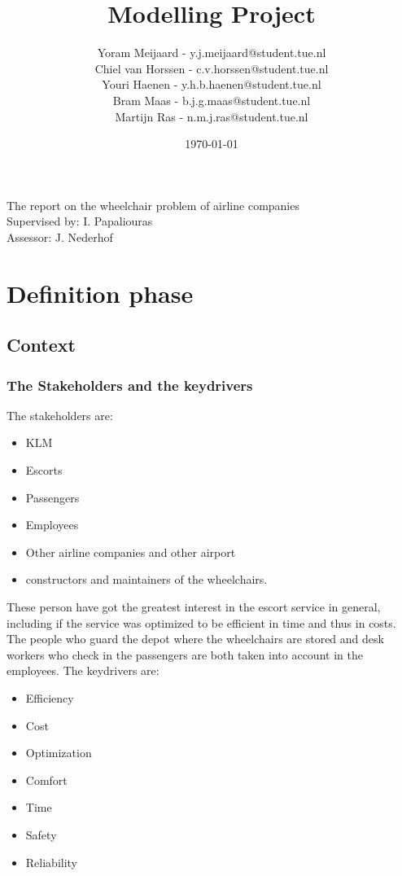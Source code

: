 \documentclass[a4paper, 11pt, notitlepage]{report}
\title{{\Huge Modelling Project} \vspace{290pt}} %
\author{Yoram Meijaard - y.j.meijaard@student.tue.nl\\Chiel van Horssen - c.v.horssen@student.tue.nl\\Youri Haenen - y.h.b.haenen@student.tue.nl\\Bram Maas - b.j.g.maas@student.tue.nl\\Martijn Ras - n.m.j.ras@student.tue.nl} %
\date{\today} %
\begin{document}
\maketitle
\begin{center}
The report on the wheelchair problem of airline companies %
\\[12pt]
Supervised by: I. Papaliouras \\ Assessor: J. Nederhof %
\end{center}
\thispagestyle{empty}
\newpage


\tableofcontents




\chapter{Definition phase}
\section{Context}
\subsection{The Stakeholders and the keydrivers }
The stakeholders are:
\begin{itemize}
 \item KLM
 \item Escorts
 \item Passengers
 \item Employees
 \item Other airline companies and other airport
 \item  constructors and maintainers of the wheelchairs.
\end{itemize}
These person have got the greatest interest in the escort service in general, including if the service was optimized to be efficient in time and thus in costs. The people who guard the depot where the wheelchairs are stored and desk workers who check in the passengers are both taken into account in the employees. The keydrivers are:
\begin{itemize}
	\item Efficiency
	\item Cost
	\item Optimization
	\item Comfort
	\item Time
	\item Safety
	\item Reliability
\end{itemize}
\end{document}
